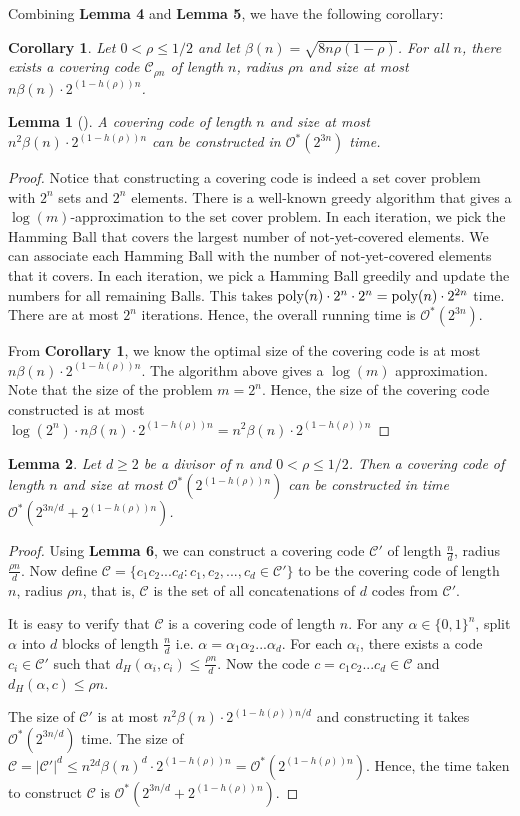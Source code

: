\documentclass[a4paper,12pts]{article}
\newcommand{\dist}[2]{d_H(#1,#2)}
\newcommand{\cc}{\mathcal{C}}
\newcommand{\bits}{\{0,1\}}
\newcommand{\poly}{\textnormal{poly}}
\renewcommand{\O}{\mathcal{O}^*}
\newtheorem{lemma}{Lemma}
\newtheorem{corollary}{Corollary}
\begin{document}
Combining \textbf{Lemma 4} and \textbf{Lemma 5}, we have the following corollary:
\begin{corollary}
	Let $0 < \rho \leq 1/2$ and let $\beta(n) = \sqrt{8n\rho(1-\rho)}$. For all $n$, there exists a covering code $\cc_{\rho n}$ of length $n$, radius $\rho n$ and size at most $n\beta(n)\cdot 2^{(1-h(\rho))n}$.
\end{corollary}
\begin{lemma}[\cite{Dantsin02}]
	A covering code of length $n$ and size at most $n^2\beta(n)\cdot 2^{(1-h(\rho))n}$ can be constructed in $\O(2^{3n})$ time.
\end{lemma}
\begin{proof}
	Notice that constructing a covering code is indeed a set cover problem with $2^n$ sets and $2^n$ elements. There is a well-known greedy algorithm that gives a $\log(m)$-approximation\cite{Hochbaum97} to the set cover problem. In each iteration, we pick the Hamming Ball that covers the largest number of not-yet-covered elements. We can associate each Hamming Ball with the number of not-yet-covered elements that it covers. In each iteration, we pick a Hamming Ball greedily and update the numbers for all remaining Balls. This takes $\poly(n) \cdot 2^n \cdot 2^n = \poly(n) \cdot 2^{2n}$ time. There are at most $2^n$ iterations. Hence, the overall running time is $\O(2^{3n})$. \par 
	From \textbf{Corollary 1}, we know the optimal size of the covering code is at most $n\beta(n)\cdot 2^{(1-h(\rho))n}$. The algorithm above gives a $\log(m)$ approximation. Note that the size of the problem $m = 2^n$. Hence, the size of the covering code constructed is at most $\log(2^n) \cdot n\beta(n)\cdot 2^{(1-h(\rho))n} = n^2\beta(n)\cdot 2^{(1-h(\rho))n}$
\end{proof}
\begin{lemma}
	Let $d\geq 2$ be a divisor of $n$ and $0<\rho \leq 1/2$. Then a covering code of length $n$ and size at most $\O(2^{(1-h(\rho))n})$ can be constructed in time $\O(2^{3n/d}+ 2^{(1-h(\rho))n})$.
\end{lemma}
\begin{proof}
	Using \textbf{Lemma 6}, we can construct a covering code $\cc'$ of length $\frac{n}{d}$, radius $\frac{\rho n}{d}$. Now define $\cc = \{c_1c_2...c_d:c_1,c_2,...,c_d \in \cc'\}$ to be the covering code of length $n$, radius $\rho n$, that is, $\cc$ is the set of all concatenations of $d$ codes from $\cc'$.\par 
	It is easy to verify that $\cc$ is a covering code of length $n$. For any $\alpha \in \bits^n$, split $\alpha$ into $d$ blocks of length $\frac{n}{d}$ i.e. $\alpha = \alpha_1\alpha_2...\alpha_d$. For each $\alpha_i$, there exists a code $c_i \in \cc'$ such that $\dist{\alpha_i}{c_i} \leq \frac{\rho n}{d}$. Now the code $c = c_1c_2...c_d \in \cc$ and $\dist{\alpha}{c} \leq \rho n$. \par 
	The size of $\cc'$ is at most $n^2\beta(n)\cdot 2^{(1-h(\rho))n/d}$ and constructing it takes $\O(2^{3n/d})$ time. The size of $\cc = |\cc'|^d \leq n^{2d}\beta(n)^d\cdot 2^{(1-h(\rho))n} = \O(2^{(1-h(\rho))n})$. Hence, the time taken to construct $\cc$ is $\O(2^{3n/d}+ 2^{(1-h(\rho))n})$.
\end{proof}
\end{document}
